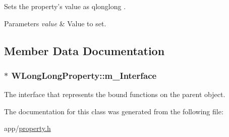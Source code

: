 Sets the property's value as qlonglong . 


\begin{DoxyParams}{Parameters}
{\em value} & Value to set. \\
\hline
\end{DoxyParams}


\subsection{Member Data Documentation}
\hypertarget{class_w_long_long_property_ae6b2b015e81593744f2ef962aa7c04b6}{
\subsubsection[{m\-\_\-\-Interface}]{$\ast$ W\-Long\-Long\-Property\-::m\-\_\-\-Interface\hspace{0.3cm}{\ttfamily [protected]}}}\label{class_w_long_long_property_ae6b2b015e81593744f2ef962aa7c04b6}
The interface that represents the bound functions on the parent object. 

The documentation for this class was generated from the following file\-:\begin{DoxyCompactItemize}
\item 
app/\hyperlink{property_8h}{property.\-h}\end{DoxyCompactItemize}
